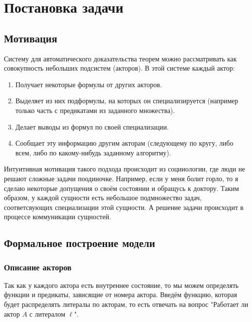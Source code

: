 \chapter{Постановка задачи}
\startrelatedwork
\label{sec:chap2}


\section{Мотивация}
Систему для автоматического доказательства теорем можно рассматривать как совокупность небольших подсистем (акторов). В этой системе каждый актор:
\begin{enumerate}
	\item Получает некоторые формулы от других акторов.
    \item Выделяет из них подформулы, на которых он специализируется (например только часть с предикатами из заданного множества).
    \item Делает выводы из формул по своей специализации.
    \item Сообщает эту информацию другим акторам (следующему по кругу, либо всем, либо по какому-нибудь заданному алгоритму).
\end{enumerate} \par
Интуитивная мотивация такого подхода происходит из социиологии, где люди не решают сложные задачи поодиночке. Например, если у меня болит горло, то я сделаю некоторые допущения о своём состоянии и обращусь к доктору. Таким образом, у каждой сущности есть небольшое подмножество задач, соответсвующих специализации этой сущности. А решение задачи происходит в процессе коммуникации сущностей.

\section{Формальное построение модели}

\subsection{Описание акторов}

Так как у каждого актора есть внутреннее состояние, то мы можем определять функции и предикаты, зависящие от номера актора. Введём функцию, которая будет распределять литералы по акторам, то есть отвечать на вопрос "Работает ли актор $A$ с литералом $\ell$".

